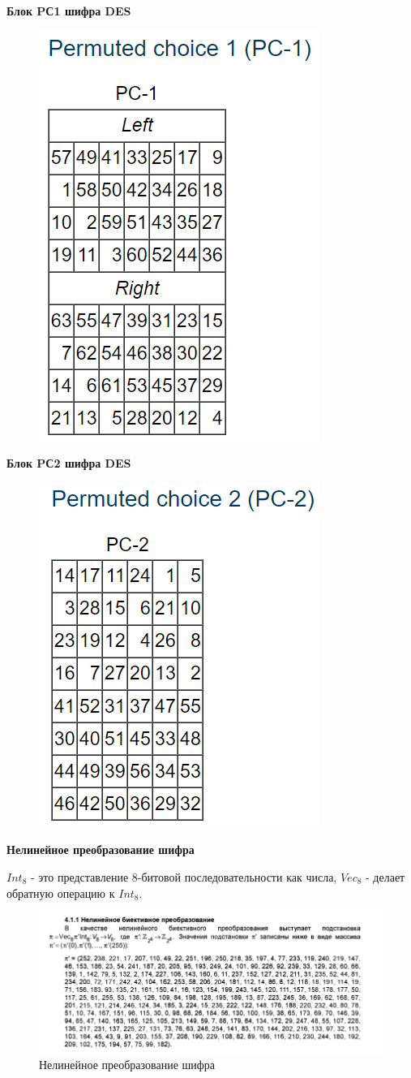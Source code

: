 \documentclass[colorthm]{./civarticle}
\begin{document}
\textbf{Блок PС1 шифра DES}

\begin{figure}[H]
    \centering
    \includegraphics[width=0.25\linewidth]{pc1.png}
    \label{fig:enter-label}
\end{figure}

\textbf{Блок PС2 шифра DES}

\begin{figure}[H]
    \centering
    \includegraphics[width=0.25\linewidth]{pc2.png}
    \label{fig:enter-label}
\end{figure}

\textbf{Нелинейное преобразование шифра \textquotedbl}

$Int_8$ - это представление 8-битовой последовательности как числа, $Vec_8$ - делает обратную операцию к $Int_8$.

\begin{figure}[H]
    \centering
    \includegraphics[width=0.5\linewidth]{permutation.png}
    \caption{Нелинейное преобразование шифра \textquotedbl}
    \label{fig:enter-label}
\end{figure}
\end{document}
